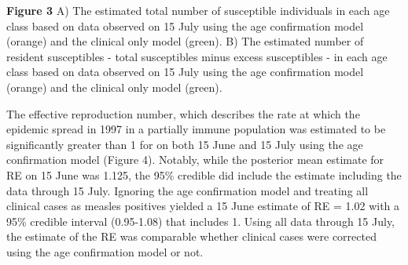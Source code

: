 \textbf{Figure 3} A) The estimated total number of susceptible
individuals in each age class based on data observed on 15 July using
the age confirmation model (orange) and the clinical only model (green).
B) The estimated number of resident susceptibles - total susceptibles
minus excess susceptibles - in each age class based on data observed on
15 July using the age confirmation model (orange) and the clinical only
model (green).

The effective reproduction number, which describes the rate at which the
epidemic spread in 1997 in a partially immune population was estimated
to be significantly greater than 1 for on both 15 June and 15 July using
the age confirmation model (Figure 4). Notably, while the posterior mean
estimate for RE on 15 June was 1.125, the 95\% credible did include the
estimate including the data through 15 July. Ignoring the age
confirmation model and treating all clinical cases as measles positives
yielded a 15 June estimate of RE = 1.02 with a 95\% credible interval
(0.95-1.08) that includes 1. Using all data through 15 July, the
estimate of the RE was comparable whether clinical cases were corrected
using the age confirmation model or not.